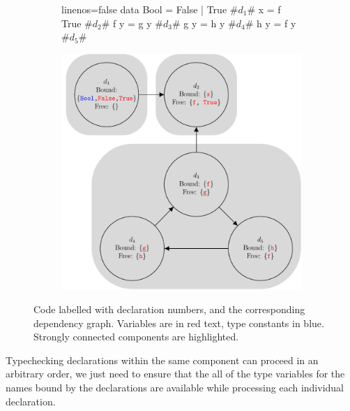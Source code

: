 \documentclass[dissertation.tex]{subfiles}
\begin{document}
{{        \begin{figure}[h]
        \centering
        \begin{subfigure}[t]{0.4\textwidth}
            \begin{haskellfigure*}{linenos=false}
            data Bool = False | True      #\(d_1\)#
            x = f True                    #\(d_2\)#
            f y = g y                     #\(d_3\)#
            g y = h y                     #\(d_4\)#
            h y = f y                     #\(d_5\)#
            \end{haskellfigure*}
        \end{subfigure}
        \begin{subfigure}[t]{0.5\textwidth}
            \includegraphics[width=\textwidth, valign=t]{figures/dependency_graph.pdf}
        \end{subfigure}
        \caption
        {
            Code labelled with declaration numbers, and the corresponding dependency graph. Variables are
            in red text, type constants in blue. Strongly connected components are highlighted.
        }
        \label{fig:dependency-graph}
        \end{figure}

        Typechecking declarations within the same component can proceed in an arbitrary order, we just need to ensure
        that the all of the type variables for the names bound by the declarations are available while processing each
        individual declaration.

}}
\end{document}
